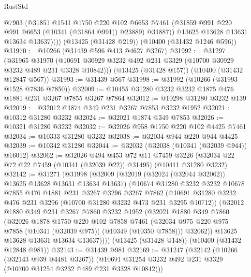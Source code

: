\begin{lexlean}{RustStd}
\begin{coremodule}
              @7903
              (@31851
                @1541
                @1750
                @220
                @102
                @6653
                @7461
                (@31859 @991 @220 @991 @6653 (@10341 (@31864 @991)) @23889)
                @31887))
            @13625
            @13628
            @13631
            @13634
            @13637))))
    (@13425 (@31428 @219))
    (@10400 (@31432 @1246 @596))
@31970 := @10266 (@31439 @596 @413 @4627 @3267)
@31992 := @31297
    (@31965
      @31970
      (@10691 @30929 @3232 @492 @231 @3329 (@10700 @30929 @3232 @489 @231 @3328 @10842)))
    (@13425 (@31428 @157))
    (@10400 (@31432 @12847 @567))
@31993 := @31439 @567
@31998 := @31992 (@10266 (@31993 @1528 @7836 @7850))
@32009 := @10455 @31280 @3232 @3232 @1875 @476 @1881 @231 @3267 @7855 @3267 @7864
@32012 := @10298 @31280 @3232 @139
@32019 := @32012 @1874 @349 @231 @3267 @7853 @3232 @1952
@32021 := @10312 @31280 @3232
@32024 := @32021 @1874 @349 @7853
@32026 := @10321 @31280 @3232
@32032 := @32026 @958 @1750 @220 @102 @4425 @7461
@32034 := @10333 @31280 @3232
@32038 := @32034 @944 @220 @944 @4425
@32039 := @10342 @31280
@32044 := @32032 (@32038 (@10341 (@32039 @944)) @16012)
@32062 := @32026
    @494
    @453
    @72
    @11
    @7459
    @3226
    (@32034 @22 @72 @22 @7459 (@10341 (@32039 @22)) @31495)
    (@10411 @31280 @3232)
@32142 := @31271
    (@31998
      (@32009
        (@32019 (@32024 (@32044 @32062)) @13625 @13628 @13631 @13634 @13637)
        (@10674
          @31280
          @3232
          @3232
          @10678
          @7855
          @476
          @1881
          @231
          @3267
          @3296
          @3267
          @7862
          (@10691 @31280 @3232 @476 @231 @3296 (@10700 @31280 @3232 @473 @231 @3295 @10712))
          (@32012
            @1880
            @349
            @231
            @3267
            @7860
            @3232
            @1952
            (@32021
              @1880
              @349
              @7860
              (@32026
                @1878
                @1750
                @220
                @102
                @7858
                @7461
                (@32034 @975 @220 @975 @7858 (@10341 (@32039 @975)) (@10349 (@10350 @7858)))
                @32062))
            @13625
            @13628
            @13631
            @13634
            @13637))))
    (@13425 (@31428 @148))
    (@10400 (@31432 @12848 @981))
@32143 := @31439 @981
@32169 := @31247
    (@32142
      (@10266 (@32143 @939 @4481 @3267))
      (@10691 @31254 @3232 @492 @231 @3329 (@10700 @31254 @3232 @489 @231 @3328 @10842)))

\end{coremodule}
\end{lexlean}
